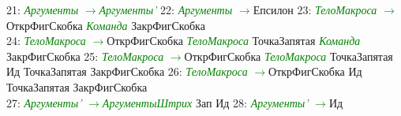 \documentclass[a0]{a0poster}
\begin{document}
21: \textcolor{Green}{\textit{Аргументы}} \textcolor{Green}{$\to$}\textcolor{Green}{\textit{Аргументы'}} 22: \textcolor{Green}{\textit{Аргументы}} \textcolor{Green}{$\to$}Епсилон 23: \textcolor{Green}{\textit{ТелоМакроса}} \textcolor{Green}{$\to$}ОткрФигСкобка \textcolor{Green}{\textit{Команда}} ЗакрФигСкобка \\
24: \textcolor{Green}{\textit{ТелоМакроса}} \textcolor{Green}{$\to$}ОткрФигСкобка \textcolor{Green}{\textit{ТелоМакроса}} ТочкаЗапятая \textcolor{Green}{\textit{Команда}} ЗакрФигСкобка 25: \textcolor{Green}{\textit{ТелоМакроса}} \textcolor{Green}{$\to$}ОткрФигСкобка \textcolor{Green}{\textit{ТелоМакроса}} ТочкаЗапятая Ид ТочкаЗапятая ЗакрФигСкобка 26: \textcolor{Green}{\textit{ТелоМакроса}} \textcolor{Green}{$\to$}ОткрФигСкобка Ид ТочкаЗапятая ЗакрФигСкобка \\
27: \textcolor{Green}{\textit{Аргументы'}} \textcolor{Green}{$\to$}\textcolor{Green}{\textit{АргументыШтрих}} Зап Ид 28: \textcolor{Green}{\textit{Аргументы'}} \textcolor{Green}{$\to$}Ид
\end{document}
